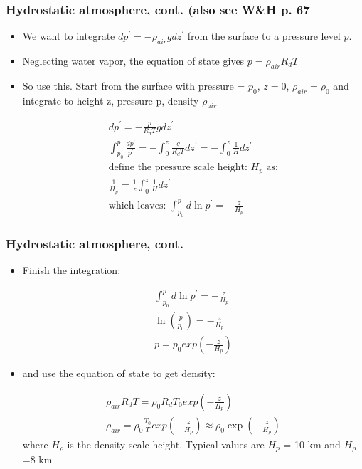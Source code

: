 \documentclass[hyperref={colorlinks=true,linkcolor=blue,urlcolor=blue},numbers]{beamer}
\begin{document}
\begin{frame}
  \frametitle{Hydrostatic atmosphere, cont. (also see W\&H p. 67 }

  \begin{itemize}
  \item We want to integrate $dp^\prime = - \rho_{air} g dz^\prime$ from the surface to
a pressure level $p$.
\item Neglecting water vapor, the equation of state gives $p = \rho_{air} R_d T$
\item So use this.  Start from the surface with pressure = $p_0$, $z=0$, $\rho_{air}=\rho_0$
and integrate to height z, pressure p, density $\rho_{air}$

  \begin{gather*}
dp^\prime =-  \frac{ p}{R_d T} g dz^\prime \\
\int_{p_0}^p \frac{dp^\prime }{p^\prime} = - \int_0^z \frac{ g}{R_d T} dz^\prime = - \int_0^z \frac{ 1}{H} dz^\prime\\
\text{define the pressure scale height: $H_p$ as:}\\
\frac{1 }{H_p}  = \frac{ 1}{z}  \int_0^z \frac{ 1}{H} dz^\prime \\
\text{which leaves: } \int_{p_0}^p d \ln p^\prime  = - \frac{z }{H_p} 
  \end{gather*}
  \end{itemize}

\end{frame}

\begin{frame}
  \frametitle{Hydrostatic atmosphere, cont. }

  \begin{itemize}
  \item Finish the integration:

\begin{gather*}
 \int_{p_0}^p d \ln p^\prime  = - \frac{z }{H_p} \\
\ln \left ( \frac{ p}{p_0} \right ) = - \frac{z }{H_p} \\
p = p_0 exp \left (- \frac{z }{H_p} \right )
  \end{gather*}


\item and use the equation of state to get density:


  \begin{gather*}
 \rho_{air} R_d T = \rho_0 R_d T_0  exp \left (- \frac{z }{H_p} \right )\\
\rho_{air}  = \rho_0 \frac{ T_0}{T}  exp \left (- \frac{z }{H_p} \right ) \approx \rho_0 \exp \left (- \frac{z }{H_\rho} \right )
  \end{gather*}
where $H_\rho$ is the density scale height.  Typical values are $H_p$ = 10 km and $H_\rho$=8 km
  \end{itemize}

\end{frame}
\end{document}
